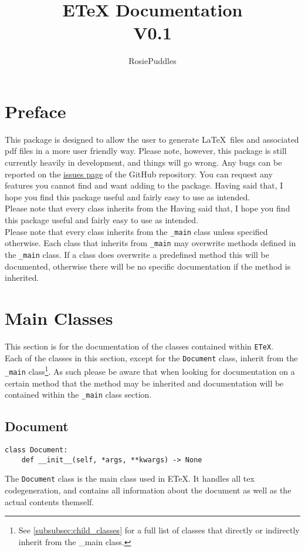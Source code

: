 \documentclass{article}
\title{ETeX Documentation\\\large V0.1}
\date{}
\author{RosiePuddles}
\begin{document}
\maketitle
\tableofcontents
\newpage

\section{Preface}\label{sec:preface}
This package is designed to allow the user to generate \LaTeX\ files and associated pdf files in a more user friendly way. Please note, however, this package is still currently heavily in development, and things will go wrong. Any bugs can be reported on the \href{https://github.com/RosiePuddles/ETeX\_from\_python/issues}{issues page} of the GitHub repository. You can request any features you cannot find and want adding to the package. Having said that, I hope you find this package useful and fairly easy to use as intended.\\
Please note that every class inherits from the  Having said that, I hope you find this package useful and fairly easy to use as intended.\\
Please note that every class inherits from the \verb|_main| class unless specified otherwise. Each class that inherits from \verb|_main| may overwrite methods defined in the \verb|_main| class. If a class does overwrite a predefined method this will be documented, otherwise there will be no specific documentation if the method is inherited.
\section{Main Classes}\label{sec:main_classes}
This section is for the documentation of the classes contained within \verb|ETeX|.\\
Each of the classes in this section, except for the \verb|Document| class, inherit from the \verb|_main| class\footnote{See \autoref{subsubsec:child_classes} for a full list of classes that directly or indirectly inherit from the \_main class.}. As such please be aware that when looking for documentation on a certain method that the method may be inherited and documentation will be contained within the \verb|_main| class section.
\subsection{Document}\label{subsec:document}
\begin{verbatim}
class Document:
	def __init__(self, *args, **kwargs) -> None
\end{verbatim}
The \verb|Document| class is the main class used in ETeX. It handles all tex codegeneration, and contains all information about the document as well as the actual contents themself.
\end{document}
